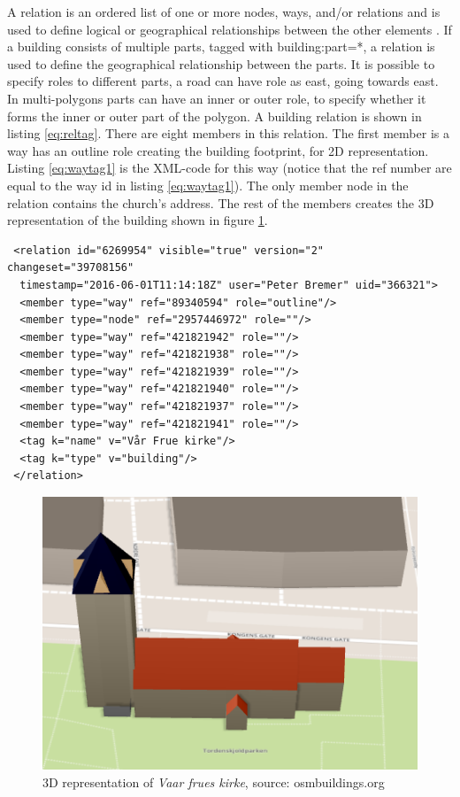 A relation is an ordered list of one or more nodes, ways, and/or relations and is used to define logical or geographical relationships between the other elements \cite{OpenStreetMape}. If a building consists of multiple parts, tagged with building:part=*, a relation is used to define the geographical relationship between the parts. It is possible to specify roles to different parts, a road can have role as east, going towards east. In multi-polygons parts can have an inner or outer role, to specify whether it forms the inner or outer part of the polygon. A building relation is shown in listing \ref{eq:reltag}. There are eight members in this relation. The first member is a way has an outline role creating the building footprint, for 2D representation. Listing \ref{eq:waytag1} is the XML-code for this way (notice that the ref number are equal to the way id in listing \ref{eq:waytag1}). The only member node in the relation contains the church's address. The rest of the members creates the 3D representation of the building shown in figure \ref{fig:fruekirke}.

\begin{lstlisting}
 <relation id="6269954" visible="true" version="2" changeset="39708156" 
  timestamp="2016-06-01T11:14:18Z" user="Peter Bremer" uid="366321">
  <member type="way" ref="89340594" role="outline"/>
  <member type="node" ref="2957446972" role=""/>
  <member type="way" ref="421821942" role=""/>
  <member type="way" ref="421821938" role=""/>
  <member type="way" ref="421821939" role=""/>
  <member type="way" ref="421821940" role=""/>
  <member type="way" ref="421821937" role=""/>
  <member type="way" ref="421821941" role=""/>
  <tag k="name" v="Vår Frue kirke"/>
  <tag k="type" v="building"/>
 </relation>
\end{lstlisting}

\begin{figure}[H]
    \centering
    \includegraphics[scale=0.5]{figures/FixedByMe/fruekirke.png}
    \caption{3D representation of \textit{Vaar frues kirke}, source: osmbuildings.org}
    \label{fig:fruekirke}
\end{figure}


